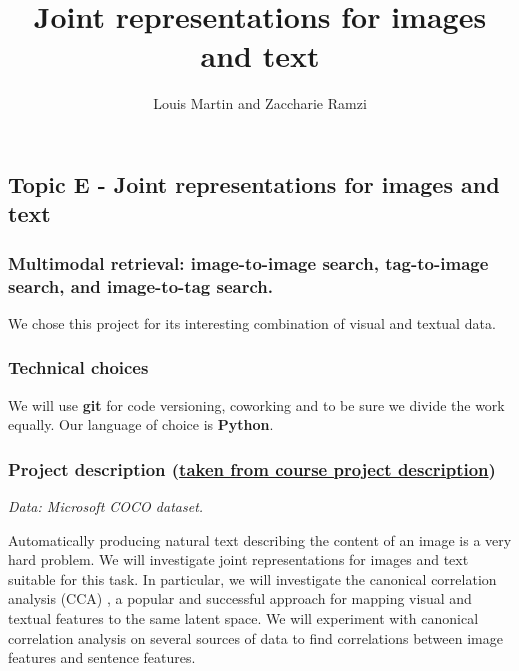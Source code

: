 \documentclass[a4paper,12pt]{article}
\begin{document}
\title{Joint representations for images and text}
\author{Louis Martin and Zaccharie Ramzi}

\maketitle

\subsection*{Topic E - Joint representations for images and text}
\subsubsection*{Multimodal retrieval: image-to-image search, tag-to-image search,
and image-to-tag search.}
We chose this project for its interesting combination of visual and textual data.

\subsubsection*{Technical choices}
We will use \textbf{git} for code versioning, coworking and to be sure we divide the work
equally. Our language of choice is \textbf{Python}.

\subsubsection*{Project description (\href{https://docs.google.com/document/d/1Efj_dul7iRcpWMyoVltM_xot4q2QfqkbW58DAR2TuFo/edit}{taken from course project description})}
\textit{Data: Microsoft COCO dataset.}

Automatically producing natural text describing the content of an image is a
very hard problem. We will investigate joint representations for images and text
suitable for this task. In particular, we will investigate the canonical
correlation analysis (CCA) \cite{normalizedcca}, a popular and successful approach for mapping
visual and textual features to the same latent space. We will experiment with
canonical correlation analysis on several sources of data to find correlations
between image features and sentence features.
\end{document}
